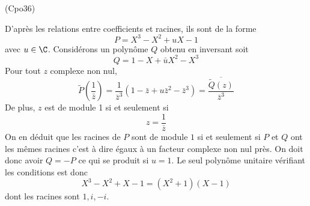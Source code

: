 \begin{tiny}(Cpo36)\end{tiny} D'après les relations entre coefficients et racines, ils sont de la forme
\begin{displaymath}
 P = X^3-X^2+uX-1
\end{displaymath}
avec $u\in \C$. Considérons un polynôme $Q$ obtenu en inversant soit
\begin{displaymath}
 Q = 1-X + \bar{u}X^2 - X^3
\end{displaymath}
Pour tout $z$ complexe non nul,
\begin{displaymath}
 \widetilde{P}(\frac{1}{\bar{z}})
= \frac{1}{\bar{z}^3}
\left(1 -\bar{z} + u\bar{z}^2-\bar{z}^3\right)
= \frac{\overline{\widetilde{Q}(z)}}{\bar{z}^3}  
\end{displaymath}
De plus, $z$ est de module 1 si et seulement si
\begin{displaymath}
 z=\frac{1}{\bar{z}}
\end{displaymath}
On en déduit que les racines de $P$ sont de module $1$ si et seulement si $P$ et $Q$ ont les mêmes racines c'est à dire  égaux à un facteur complexe non nul près. On doit donc avoir $Q=-P$ ce qui se produit si $u=1$. Le seul polynôme unitaire vérifiant les conditions est donc
\begin{displaymath}
 X^3-X^2+X-1=(X^2+1)(X-1)
\end{displaymath}
dont les racines sont $1, i, -i$.